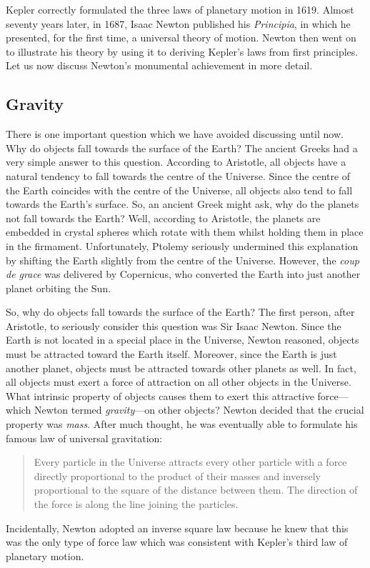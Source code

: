 Kepler correctly formulated the
 three laws of planetary motion in 1619.  Almost seventy years later, in 1687,
Isaac Newton published his {\em Principia}, in which he presented, for the
first time, a universal theory of motion. Newton then went on to
illustrate his
 theory by using it to deriving Kepler's laws from first principles. Let us now discuss Newton's
monumental achievement in more detail.

\subsection{Gravity}
There is one important question which we have avoided discussing until now. Why do objects fall towards the
surface of the Earth? The ancient Greeks had a very simple answer to this question.
According to Aristotle, all objects have a natural tendency to fall towards the centre of
the Universe. Since the centre of the Earth coincides with the centre of the Universe, all objects also
tend to fall towards the Earth's surface. So, an ancient Greek might ask, why do the planets
not fall towards the Earth? Well, according to Aristotle, the planets are embedded in crystal
spheres which rotate with them whilst holding them in place in the firmament. Unfortunately,
Ptolemy  seriously undermined this explanation by shifting the Earth slightly from the 
centre of the Universe. However, the {\em coup de grace} was delivered by Copernicus,
who converted the Earth into just another planet orbiting the Sun.

So, why do objects fall towards the surface of the Earth? The first person, after Aristotle, to seriously
consider this question was Sir Isaac Newton. Since the Earth is not located in a special
place in the Universe, Newton reasoned, objects must be attracted toward the Earth itself.
Moreover, since the Earth is just another planet, objects must be attracted towards other
planets as well. In fact, all objects must exert a force of attraction on all
other objects in the Universe. What intrinsic property of  objects causes them
to exert this attractive force---which Newton termed {\em gravity}---on other objects? Newton  decided that the
crucial property was {\em mass}. After much thought, he was eventually able to
formulate his famous law of universal gravitation:
\begin{quote}
{\sf Every particle in the Universe attracts every other particle with a
force directly proportional to the product of their masses and inversely
proportional to the square of the distance between them. The direction
of the force is along the line joining the particles.}
\end{quote}
Incidentally, Newton adopted an inverse square law because he knew that this was the
only type of force law which was consistent with Kepler's third law of planetary motion.

